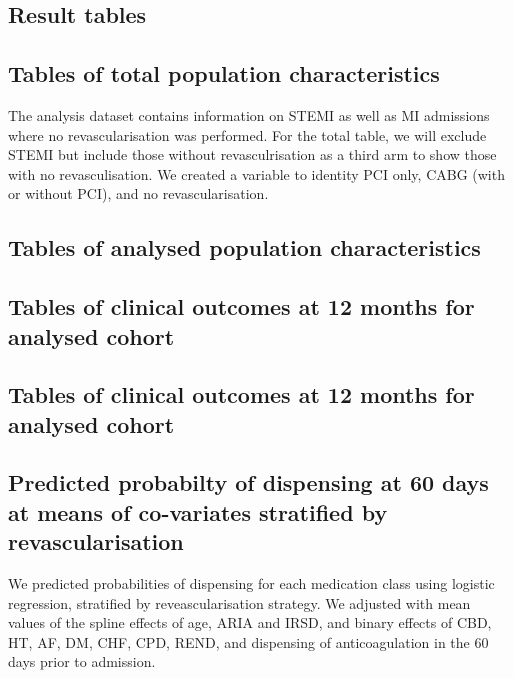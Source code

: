 \documentclass[11pt]{article}
\begin{document}
\subsection{Result tables}
\subsection{Tables of total population characteristics}
The analysis dataset contains information on STEMI as well as MI admissions where no revascularisation was performed. For the total table, we will exclude STEMI but include those without revasculrisation as a third arm to show those with no revasculisation. We created a variable to identity PCI only, CABG (with or without PCI), and no revascularisation. \\ 
\color{violet}
\begin{stlog}\end{stlog}
\color{black}
\pagebreak
\subsection{Tables of analysed population characteristics}
\color{violet}
\begin{stlog}\end{stlog}
\color{black}
\pagebreak
\subsection{Tables of clinical outcomes at 12 months for analysed cohort}
\color{violet}
\begin{stlog}\end{stlog}
\color{black}
\subsection{Tables of clinical outcomes at 12 months for analysed cohort}
\color{violet}
\begin{stlog}\end{stlog}
\color{black}
\pagebreak
\subsection{Predicted probabilty of dispensing at 60 days at means of co-variates stratified by revascularisation}
We predicted probabilities of dispensing for each medication class using logistic regression, stratified by reveascularisation strategy. We adjusted with mean values of the spline effects of age, ARIA and IRSD, and binary effects of CBD, HT, AF, DM, CHF, CPD, REND, and dispensing of anticoagulation in the 60 days prior to admission.
\color{violet}
\begin{stlog}\end{stlog}
\color{black}
\pagebreak
\end{document}
